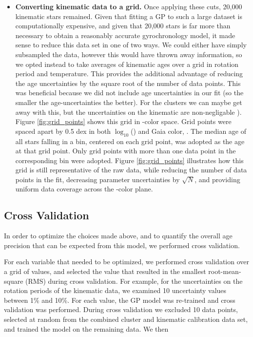 \begin{itemize}
\item {\bf Converting kinematic data to a grid.}
Once applying these cuts, 20,000 kinematic stars remained.
        Given that fitting a GP to such a large dataset is computationally
        expensive, and given that 20,000 stars is far more than necessary to
        obtain a reasonably accurate gyrochronology model, it made sense to
        reduce this data set in one of two ways.
        We could either have simply subsampled the data, however this would
        have thrown away
        information, so we opted instead to take averages of kinematic ages
        over a grid in rotation period and temperature.
This provides the additional advantage of reducing the age uncertainties by
        the square root of the number of data points.
        This was beneficial because we did not include age uncertainties in
        our fit (so the smaller the age-uncertainties the better).
For the clusters we can maybe get away with this, but the uncertainties on the
kinematic are non-negligable \citep[likely 1-2 Gyr][]{lu2021}).
Figure \ref{fig:grid_points} shows this grid in \prot-color space.
        Grid points were spaced apart by 0.5 dex in both $\log_{10}$(\prot)
        and Gaia color, \gcolor.
The median age of all stars falling in a bin, centered on each grid point, was
adopted as the age at that grid point.
Only grid points with more than one data point in the corresponding bin were
adopted.
Figure \ref{fig:grid_points} illustrates how this grid is still representative
of the raw data, while reducing the number of data points in the fit,
decreasing parameter uncertainties by $\sqrt N$, and providing uniform data
coverage across the \prot-color plane.
\end{itemize}

\subsection{Cross Validation}
In order to optimize the choices made above, and to quantify the overall age
precision that can be expected from this model, we performed cross validation.

For each variable that needed to be optimized, we performed cross validation
over a grid of values, and selected the value that resulted in the smallest
root-mean-square (RMS) during cross validation.
For example, for the uncertainties on the rotation periods of the kinematic
data, we examined 10 uncertainty values between 1\% and 10\%.
For each value, the GP model was re-trained and cross validation was
performed.
During cross validation we excluded 10 data points, selected at random from
the combined cluster and kinematic calibration data set, and trained the model
on the remaining data.
We then


